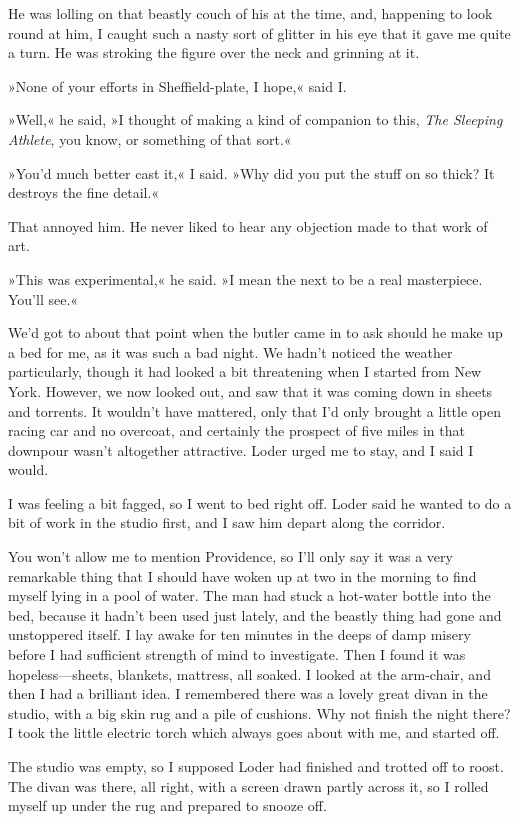 He was lolling on that beastly couch of his at the time, and, happening to look round at him, I caught such a nasty sort of glitter in his eye that it gave me quite a turn. He was stroking the figure over the neck and grinning at it.

»None of your efforts in Sheffield-plate, I hope,« said I.

»Well,« he said, »I thought of making a kind of companion to this, \textit{The Sleeping Athlete}, you know, or something of that sort.«

»You'd much better cast it,« I said. »Why did you put the stuff on so thick? It destroys the fine detail.«

That annoyed him. He never liked to hear any objection made to that work of art.

»This was experimental,« he said. »I mean the next to be a real masterpiece. You'll see.«

We'd got to about that point when the butler came in to ask should he make up a bed for me, as it was such a bad night. We hadn't noticed the weather particularly, though it had looked a bit threatening when I started from New York. However, we now looked out, and saw that it was coming down in sheets and torrents. It wouldn't have mattered, only that I'd only brought a little open racing car and no overcoat, and certainly the prospect of five miles in that downpour wasn't altogether attractive. Loder urged me to stay, and I said I would.

I was feeling a bit fagged, so I went to bed right off. Loder said he wanted to do a bit of work in the studio first, and I saw him depart along the corridor.

You won't allow me to mention Providence, so I'll only say it was a very remarkable thing that I should have woken up at two in the morning to find myself lying in a pool of water. The man had stuck a hot-water bottle into the bed, because it hadn't been used just lately, and the beastly thing had gone and unstoppered itself. I lay awake for ten minutes in the deeps of damp misery before I had sufficient strength of mind to investigate. Then I found it was hopeless—sheets, blankets, mattress, all soaked. I looked at the arm-chair, and then I had a brilliant idea. I remembered there was a lovely great divan in the studio, with a big skin rug and a pile of cushions. Why not finish the night there? I took the little electric torch which always goes about with me, and started off.

The studio was empty, so I supposed Loder had finished and trotted off to roost. The divan was there, all right, with a screen drawn partly across it, so I rolled myself up under the rug and prepared to snooze off.

